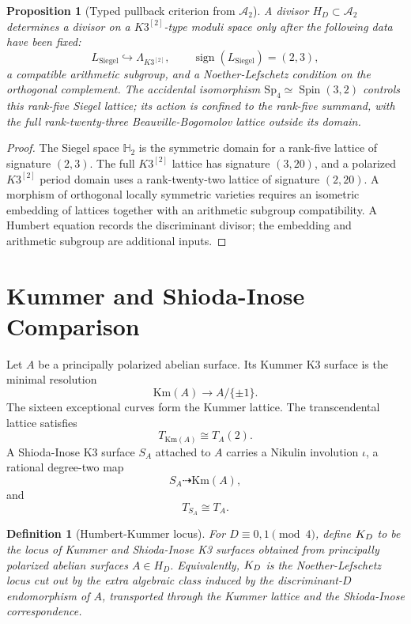 \documentclass[11pt]{article}
\newtheorem{proposition}[theorem]{Proposition}
\newtheorem{definition}[theorem]{Definition}
\providecommand{\HH}{\mathbb{H}}
\providecommand{\cA}{\mathcal{A}}
\providecommand{\Km}{\mathrm{Km}}
\providecommand{\Sp}{\mathrm{Sp}}
\begin{document}
\begin{proposition}[Typed pullback criterion from \(\cA_2\)]
\label{prop:typed-humbert-pullback}
A divisor \(H_D\subset\cA_2\) determines a divisor on a
\(K3^{[2]}\)-type moduli space only after the following data have been
fixed:
\[
  L_{\mathrm{Siegel}}\hookrightarrow\Lambda_{K3^{[2]}},
  \qquad
  \operatorname{sign}(L_{\mathrm{Siegel}})=(2,3),
\]
a compatible arithmetic subgroup, and a Noether-Lefschetz condition on
the orthogonal complement.  The accidental isomorphism
\(\Sp_4\simeq\operatorname{Spin}(3,2)\) controls this rank-five
Siegel lattice; its action is confined to the rank-five summand, with
the full rank-twenty-three Beauville-Bogomolov lattice outside its
domain.
\end{proposition}

\begin{proof}
The Siegel space \(\HH_2\) is the symmetric domain for a rank-five
lattice of signature \((2,3)\).  The full \(K3^{[2]}\) lattice has
signature \((3,20)\), and a polarized \(K3^{[2]}\) period domain uses a
rank-twenty-two lattice of signature \((2,20)\).  A morphism of
orthogonal locally symmetric varieties requires an isometric embedding
of lattices together with an arithmetic subgroup compatibility.  A
Humbert equation records the discriminant divisor; the embedding and
arithmetic subgroup are additional inputs.
\end{proof}

\section{Kummer and Shioda-Inose Comparison}

Let \(A\) be a principally polarized abelian surface.  Its Kummer K3
surface is the minimal resolution
\[
  \Km(A)\longrightarrow A/\{\pm1\}.
\]
The sixteen exceptional curves form the Kummer lattice.  The
transcendental lattice satisfies
\[
  T_{\Km(A)}\cong T_A(2).
\]
A Shioda-Inose K3 surface \(S_A\) attached to \(A\) carries a Nikulin
involution \(\iota\), a rational degree-two map
\[
  S_A\dashrightarrow\Km(A),
\]
and
\[
  T_{S_A}\cong T_A.
\]

\begin{definition}[Humbert-Kummer locus]
\label{def:humbert-kummer-locus}
For \(D\equiv0,1\pmod4\), define \(K_D\) to be the locus of Kummer
and Shioda-Inose K3 surfaces obtained from principally polarized
abelian surfaces \(A\in H_D\).  Equivalently, \(K_D\) is the
Noether-Lefschetz locus cut out by the extra algebraic class induced by
the discriminant-\(D\) endomorphism of \(A\), transported through the
Kummer lattice and the Shioda-Inose correspondence.
\end{definition}
\end{document}
